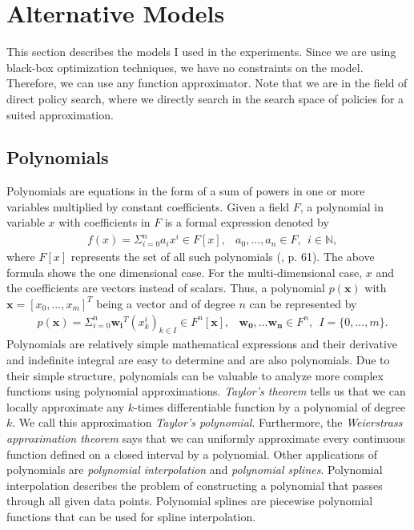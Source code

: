 
\section{Alternative Models}
\label{sec:models}
This section describes the models I used in the experiments. Since we are using black-box optimization techniques, we have no constraints on the model. Therefore, we can use any function approximator. Note that we are in the field of direct policy search, where we directly search in the search space of policies for a suited approximation.

\subsection{Polynomials}
Polynomials are equations in the form of a sum of powers in one or more variables multiplied by constant coefficients. Given a field $F$, a polynomial in variable $x$ with coefficients in $F$ is a formal expression denoted by
\begin{align*}
  &f(x) = \Sigma_{i=0}^{n} a_i x^i \in F[x], &a_0, ..., a_n \in F, \ \ i \in \mathbb{N},
\end{align*}
where $F[x]$ represents the set of all such polynomials (\cite{fischer2014}, p. 61). The above formula shows the one dimensional case. For the multi-dimensional case, $x$ and the coefficients are vectors instead of scalars. Thus, a polynomial $p(\mathbf{x})$ with $\mathbf{x} = [x_0, ..., x_m]^T$ being a vector and of degree $n$ can be represented by
\begin{align*}
  &p(\mathbf{x}) = \Sigma_{i=0}^{n} \mathbf{w_i}^T (x_k^i)_{k \in I} \in F^n[\mathbf{x}], &\mathbf{w_0}, ... \mathbf{w_n} \in F^n, \ \ I = \{0, ..., m\}.
\end{align*}
Polynomials are relatively simple mathematical expressions and their derivative and indefinite integral are easy to determine and are also polynomials. Due to their simple structure, polynomials can be valuable to analyze more complex functions using polynomial approximations. \textit{Taylor's theorem} tells us that we can locally approximate any $k$-times differentiable function by a polynomial of degree $k$. We call this approximation \textit{Taylor's polynomial}. Furthermore, the \textit{Weierstrass approximation theorem} says that we can uniformly approximate every continuous function defined on a closed interval by a polynomial. Other applications of polynomials are \textit{polynomial interpolation} and \textit{polynomial splines}. Polynomial interpolation describes the problem of constructing a polynomial that passes through all given data points. Polynomial splines are piecewise polynomial functions that can be used for spline interpolation.

